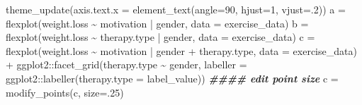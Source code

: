 \documentclass[
  english,
  man]{apa6}
\newenvironment{Shaded}{\begin{snugshade}}{\end{snugshade}}
\newcommand{\AttributeTok}[1]{\textcolor[rgb]{0.77,0.63,0.00}{#1}}
\newcommand{\DecValTok}[1]{\textcolor[rgb]{0.00,0.00,0.81}{#1}}
\newcommand{\DocumentationTok}[1]{\textcolor[rgb]{0.56,0.35,0.01}{\textbf{\textit{#1}}}}
\newcommand{\FunctionTok}[1]{\textcolor[rgb]{0.00,0.00,0.00}{#1}}
\newcommand{\NormalTok}[1]{#1}
\newcommand{\OtherTok}[1]{\textcolor[rgb]{0.56,0.35,0.01}{#1}}
\newcommand{\SpecialCharTok}[1]{\textcolor[rgb]{0.00,0.00,0.00}{#1}}
\begin{document}
\begin{Shaded}
\begin{Highlighting}[]
\FunctionTok{theme\_update}\NormalTok{(}\AttributeTok{axis.text.x =} \FunctionTok{element\_text}\NormalTok{(}\AttributeTok{angle=}\DecValTok{90}\NormalTok{, }\AttributeTok{hjust=}\DecValTok{1}\NormalTok{, }\AttributeTok{vjust=}\NormalTok{.}\DecValTok{2}\NormalTok{))}
\NormalTok{a }\OtherTok{=} \FunctionTok{flexplot}\NormalTok{(weight.loss }\SpecialCharTok{\textasciitilde{}}\NormalTok{ motivation }\SpecialCharTok{|}\NormalTok{ gender, }
             \AttributeTok{data =}\NormalTok{ exercise\_data) }
\NormalTok{b }\OtherTok{=} \FunctionTok{flexplot}\NormalTok{(weight.loss }\SpecialCharTok{\textasciitilde{}}\NormalTok{ therapy.type }\SpecialCharTok{|}\NormalTok{ gender, }
             \AttributeTok{data =}\NormalTok{ exercise\_data)}
\NormalTok{c }\OtherTok{=} \FunctionTok{flexplot}\NormalTok{(weight.loss }\SpecialCharTok{\textasciitilde{}}\NormalTok{ motivation }\SpecialCharTok{|}\NormalTok{  gender }\SpecialCharTok{+}\NormalTok{ therapy.type, }
             \AttributeTok{data =}\NormalTok{ exercise\_data) }\SpecialCharTok{+}
\NormalTok{      ggplot2}\SpecialCharTok{::}\FunctionTok{facet\_grid}\NormalTok{(therapy.type }\SpecialCharTok{\textasciitilde{}}\NormalTok{ gender, }
              \AttributeTok{labeller =}\NormalTok{ ggplot2}\SpecialCharTok{::}\FunctionTok{labeller}\NormalTok{(}\AttributeTok{therapy.type =}\NormalTok{ label\_value)) }
\DocumentationTok{\#\#\#\# edit point size}
\NormalTok{c }\OtherTok{=} \FunctionTok{modify\_points}\NormalTok{(c, }\AttributeTok{size=}\NormalTok{.}\DecValTok{25}\NormalTok{)}
\end{Highlighting}
\end{Shaded}

\normalsize

\small
\end{document}
